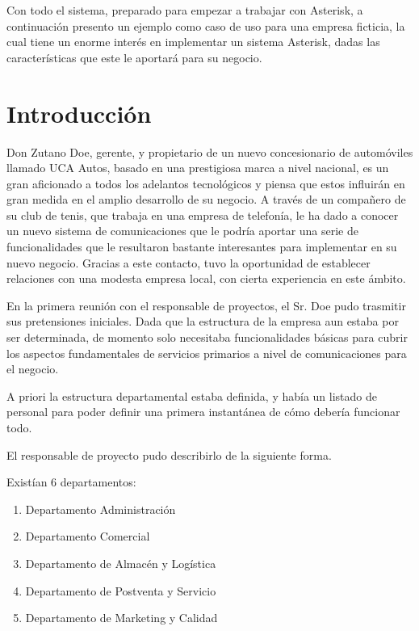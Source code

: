 
Con todo el sistema, preparado para empezar a trabajar con Asterisk, a continuación presento un ejemplo como caso de uso para una empresa ficticia, la cual tiene un enorme interés en implementar un sistema Asterisk, dadas las características que este le aportará para su negocio.

\color[rgb]{0,0,1}

\section{Introducción}

Don Zutano Doe, gerente, y propietario de un nuevo concesionario de automóviles llamado UCA Autos, basado en una prestigiosa marca a nivel nacional, es un gran aficionado a todos los adelantos tecnológicos y piensa que estos influirán en gran medida en el amplio desarrollo de su negocio. A través de un compañero de su club de tenis, que trabaja en una empresa de telefonía, le ha dado a conocer un nuevo sistema de comunicaciones que le podría aportar una serie de funcionalidades que le resultaron bastante interesantes para implementar en su nuevo negocio. Gracias a este contacto, tuvo la oportunidad de establecer relaciones con una modesta empresa local, con cierta experiencia en este ámbito.

En la primera reunión con el responsable de proyectos, el Sr. Doe pudo trasmitir sus pretensiones iniciales. Dada que la estructura de la empresa aun estaba por ser determinada, de momento solo necesitaba funcionalidades básicas para cubrir los aspectos fundamentales de servicios primarios a nivel de comunicaciones para el negocio.

A priori la estructura departamental estaba definida, y había un listado de personal para poder definir una primera instantánea de cómo debería funcionar todo.

El responsable de proyecto pudo describirlo de la siguiente forma.

Existían 6 departamentos:

\begin{enumerate}

\item Departamento Administración
\item Departamento Comercial
\item Departamento de Almacén y Logística
\item Departamento de Postventa y Servicio
\item Departamento de Marketing y Calidad

\end{enumerate}

